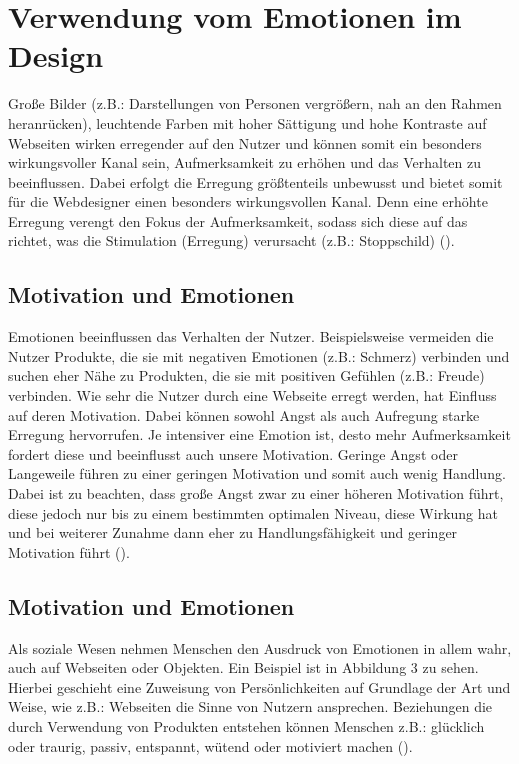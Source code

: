 \documentclass[./dokumentation.tex]{subfiles}
\begin{document}
\chapter{Verwendung vom Emotionen im Design}
Große Bilder (z.B.: Darstellungen von Personen vergrößern, nah an den Rahmen heranrücken), leuchtende Farben mit hoher Sättigung und hohe Kontraste auf Webseiten wirken erregender auf den Nutzer und können somit ein besonders wirkungsvoller Kanal sein, Aufmerksamkeit zu erhöhen und das Verhalten zu beeinflussen. Dabei erfolgt die Erregung größtenteils unbewusst und bietet somit für die Webdesigner einen besonders wirkungsvollen Kanal. Denn eine erhöhte Erregung verengt den Fokus der Aufmerksamkeit, sodass sich diese auf das richtet,  was die Stimulation (Erregung) verursacht (z.B.: Stoppschild) (\cite{vanGorp2013}). 

\section{Motivation und Emotionen}
Emotionen beeinflussen das Verhalten der Nutzer. Beispielsweise vermeiden die Nutzer Produkte, die sie mit negativen Emotionen (z.B.: Schmerz) verbinden und suchen eher Nähe zu Produkten, die sie mit positiven Gefühlen (z.B.: Freude) verbinden. Wie sehr die Nutzer durch eine Webseite erregt werden, hat Einfluss auf deren Motivation. Dabei können sowohl Angst als auch Aufregung starke Erregung hervorrufen. Je intensiver eine Emotion ist, desto mehr Aufmerksamkeit fordert diese und beeinflusst auch unsere Motivation. Geringe Angst oder Langeweile führen zu einer geringen Motivation und somit auch wenig Handlung. Dabei ist zu beachten, dass große Angst zwar zu einer höheren Motivation führt, diese jedoch nur bis zu einem bestimmten optimalen Niveau, diese Wirkung hat und bei weiterer Zunahme dann eher zu Handlungsfähigkeit und geringer Motivation führt (\cite{vanGorp2013}).

\section{Motivation und Emotionen}
Als soziale Wesen nehmen Menschen den Ausdruck von Emotionen in allem wahr, auch auf Webseiten oder Objekten. Ein Beispiel ist in Abbildung 3 zu sehen. Hierbei geschieht eine Zuweisung von Persönlichkeiten auf Grundlage der Art und Weise, wie z.B.: Webseiten die Sinne von Nutzern ansprechen. Beziehungen die durch Verwendung von Produkten entstehen können Menschen z.B.: glücklich oder traurig, passiv, entspannt, wütend oder motiviert machen (\cite{vanGorp2013}). \\
\end{document}
